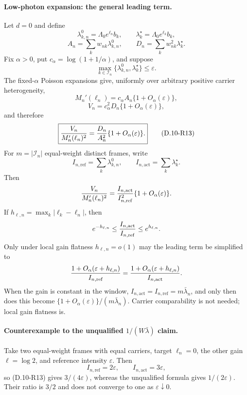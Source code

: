 \paragraph{Low-photon expansion: the general leading term.}
Let $d=0$ and define
\[
 \lambda_{k,n}^{0}=\Lambda_0e^{\ell_n}b_k,\qquad
 \lambda_k^\star=\Lambda_0e^{\ell_k}b_k,
\]
\[
 A_n=\sum_kw_{nk}\lambda_{k,n}^{0},\qquad
 D_n=\sum_kw_{nk}^2\lambda_k^\star.
\]
Fix $\alpha>0$, put $c_\alpha=\log(1+1/\alpha)$, and suppose
\[
 \max_{k\in\mathcal I_n}\{\lambda_{k,n}^{0},\lambda_k^\star\}
 \le\varepsilon.
\]
The fixed-$\alpha$ Poisson expansions give, uniformly over arbitrary
positive carrier heterogeneity,
\[
 M_n'(\ell_n)=c_\alpha A_n\{1+O_\alpha(\varepsilon)\},
\]
\[
 V_n=c_\alpha^2D_n\{1+O_\alpha(\varepsilon)\},
\]
and therefore
\begin{equation}
 \boxed{
 {V_n\over M_n'(\ell_n)^2}
 ={D_n\over A_n^2}\{1+O_\alpha(\varepsilon)\}.}
 \tag{D.10-R13}
\end{equation}
For $m=|\mathcal I_n|$ equal-weight distinct frames, write
\[
 I_{n,\mathrm{ref}}=\sum_k\lambda_{k,n}^{0},\qquad
 I_{n,\mathrm{act}}=\sum_k\lambda_k^\star.
\]
Then
\[
 {V_n\over M_n'(\ell_n)^2}
 ={I_{n,\mathrm{act}}\over I_{n,\mathrm{ref}}^2}
 \{1+O_\alpha(\varepsilon)\}.
\]
If $h_{\ell,n}=\max_k|\ell_k-\ell_n|$, then
\[
 e^{-h_{\ell,n}}
 \le {I_{n,\mathrm{act}}\over I_{n,\mathrm{ref}}}
 \le e^{h_{\ell,n}}.
\]
Only under local gain flatness $h_{\ell,n}=o(1)$ may the leading term
be simplified to
\[
 {1+O_\alpha(\varepsilon+h_{\ell,n})
  \over I_{n,\mathrm{ref}}}
 ={1+O_\alpha(\varepsilon+h_{\ell,n})
  \over I_{n,\mathrm{act}}}.
\]
When the gain is constant in the window,
$I_{n,\mathrm{act}}=I_{n,\mathrm{ref}}=m\bar\lambda_n$, and only then
does this become $\{1+O_\alpha(\varepsilon)\}/(m\bar\lambda_n)$.
Carrier comparability is not needed; local gain flatness is.

\paragraph{Counterexample to the unqualified $1/(W\bar\lambda)$ claim.}
Take two equal-weight frames with equal carriers, target $\ell_n=0$,
the other gain $\ell=\log2$, and reference intensity $\varepsilon$.
Then
\[
 I_{n,\mathrm{ref}}=2\varepsilon,\qquad
 I_{n,\mathrm{act}}=3\varepsilon,
\]
so (D.10-R13) gives $3/(4\varepsilon)$, whereas the unqualified formula
gives $1/(2\varepsilon)$.  Their ratio is $3/2$ and does not converge
to one as $\varepsilon\downarrow0$.

